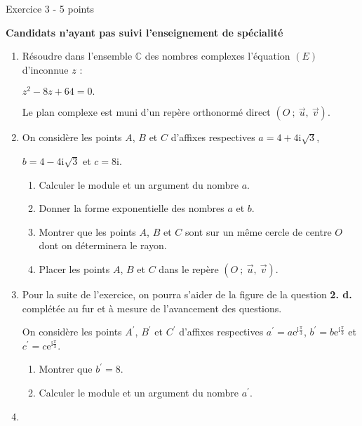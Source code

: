 
%
\begin{h2}Exercice 3 - 5 points\end{h2}
\textbf{Candidats n'ayant pas suivi l'enseignement de spécialité}
\begin{enumerate}
     \item
     Résoudre dans l'ensemble $\mathbb{C}$ des nombres complexes l'équation $(E)$ d'inconnue $z$ :
     \begin{center}$z^2-8z+64 = 0.$\end{center}
     Le plan complexe est muni d'un repère orthonormé direct $\left(O~;~\vec{u},~\vec{v}\right)$.
     \item
     On considère les points $A$, $B$ et $C$ d'affixes respectives $a = 4+4\text{i}\sqrt{3}$,
     \par
     $b = 4-4\text{i}\sqrt{3}$ et $c = 8\text{i}$.
     \begin{enumerate}[label=\alph*.] 
           \item 
         Calculer le module et un argument du nombre $a$.
          \item 
          Donner la forme exponentielle des nombres $a$ et $b$.
          \item
          Montrer que les points $A$, $B$ et $C$ sont sur un même cercle de centre $O$ dont on déterminera le rayon.
          \item
          Placer les points $A$, $B$ et $C$ dans le repère $\left(O~;~\vec{u},~\vec{v}\right)$.
     \end{enumerate}
     \item
     Pour la suite de l'exercice, on pourra s'aider de la figure de la question \textbf{2. d.} complétée au fur et à mesure de l'avancement des questions.
     \par
     On considère les points $A^\prime$, $B^\prime$ et $C^\prime$ d'affixes respectives $a^\prime = a \text{e}^{\text{i}\frac{\pi}{3}}$, $b^\prime = b\text{e}^{\text{i}\frac{\pi}{3}}$ et $c^\prime = c\text{e}^{\text{i}\frac{\pi}{3}}$.
     \begin{enumerate}[label=\alph*.] 
          \item
          Montrer que $b^\prime = 8$.
          \item
          Calculer le module et un argument du nombre $a^\prime$.
     \end{enumerate}
     \item

\end{enumerate}
